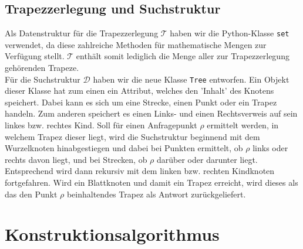 \documentclass[11pt, a4paper]{article}
\newcommand{\T}{\ensuremath{\mathcal{T}} }
\newcommand{\D}{\ensuremath{\mathcal{D}} }
\begin{document}
\subsection{Trapezzerlegung und Suchstruktur}

Als Datenstruktur für die Trapezzerlegung \T haben wir die Python-Klasse \texttt{set} verwendet, da diese zahlreiche Methoden für mathematische Mengen zur Verfügung stellt. \T enthält somit lediglich die Menge aller zur Trapezzerlegung gehörenden Trapeze.\\
Für die Suchstruktur \D haben wir die neue Klasse \texttt{Tree} entworfen. Ein Objekt dieser Klasse hat zum einen ein Attribut, welches den 'Inhalt' des Knotens speichert. Dabei kann es sich um eine Strecke, einen Punkt oder ein Trapez handeln. Zum anderen speichert es einen Links- und einen Rechtsverweis auf sein linkes bzw. rechtes Kind. Soll für einen Anfragepunkt $\rho$ ermittelt werden, in welchem Trapez dieser liegt, wird die Suchstruktur beginnend mit dem Wurzelknoten hinabgestiegen und dabei bei Punkten ermittelt, ob $\rho$ links oder rechts davon liegt, und bei Strecken, ob $\rho$ darüber oder darunter liegt. Entsprechend wird dann rekursiv mit dem linken bzw. rechten Kindknoten fortgefahren. Wird ein Blattknoten und damit ein Trapez erreicht, wird dieses als das den Punkt $\rho$ beinhaltendes Trapez als Antwort zurückgeliefert.

\section{Konstruktionsalgorithmus}
\end{document}
